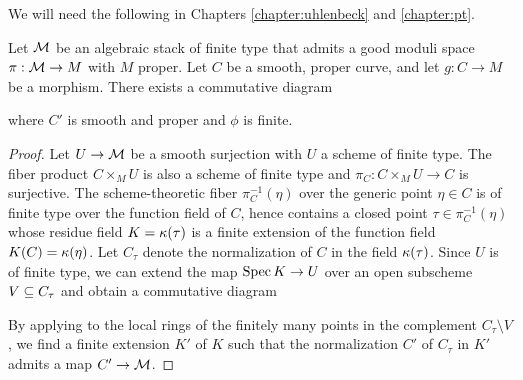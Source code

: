 We will need the following in Chapters \ref{chapter:uhlenbeck} and \ref{chapter:pt}.
\begin{lem}\label{finitecurveextension}
    Let $\mathcal{M}$ be an algebraic stack of finite type that admits a good moduli space $\pi: \mathcal{M} \to M$ with $M$ proper. Let $C$ be a smooth, proper curve, and let $g: C \to M$ be a morphism. There exists a commutative diagram
    \begin{center}
    \end{center}
    where $C'$ is smooth and proper and $\phi$ is finite.
\end{lem}
\begin{proof}
    Let $U \to \mathcal{M}$ be a smooth surjection with $U$ a scheme of finite type. The fiber product $C \times_M U$ is also a scheme of finite type and $\pi_C: C \times_M U \to C$ is surjective. The scheme-theoretic fiber $\pi_C^{-1}(\eta)$ over the generic point $\eta \in C$ is of finite type over the function field of $C$, hence contains a closed point $\tau \in \pi_C^{-1}(\eta)$ whose residue field $K = \kappa(\tau)$ is a finite extension of the function field $K(C) = \kappa(\eta)$. Let $C_\tau$ denote the normalization of $C$ in the field $\kappa(\tau)$. Since $U$ is of finite type, we can extend the map $\operatorname{\mathrm{Spec}} K \to U$ over an open subscheme $V \subseteq C_\tau$ and obtain a commutative diagram
    \begin{center}
    \end{center}
    By applying \cite[Theorem A.8]{AHLH} to the local rings of the finitely many points in the complement $C_\tau \setminus V$, we find a finite extension $K'$ of $K$ such that the normalization $C'$ of $C_\tau$ in $K'$ admits a map $C' \to \mathcal{M}$.
\end{proof}

